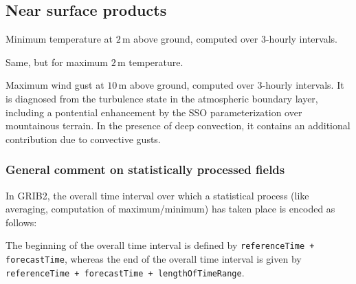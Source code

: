 \subsection{Near surface products}
\begin{description}[leftmargin=3.0cm,style=sameline]
  \item [TMIN\_2M]  Minimum temperature at $2\,\mathrm{m}$ above ground, computed over $3$-hourly intervals. 
  \item [TMAX\_2M]  Same, but for maximum $2\,\mathrm{m}$ temperature.
  \item [VMAX\_10M] Maximum wind gust at $10\,\mathrm{m}$ above ground, computed over $3$-hourly intervals. It is diagnosed 
                    from the turbulence state in the atmospheric boundary layer, including a pontential enhancement by the 
                    SSO parameterization over mountainous terrain. In the presence of deep convection, it contains an additional 
                    contribution due to convective gusts.
\end{description}



\subsubsection{General comment on statistically processed fields}

In GRIB2, the overall time interval over which a statistical process (like averaging, computation of maximum/minimum) has taken place is 
encoded as follows:

The beginning of the overall time interval is defined by \texttt{referenceTime + forecastTime}, whereas the end of the 
overall time interval is given by \texttt{referenceTime + forecastTime + lengthOfTimeRange}.




